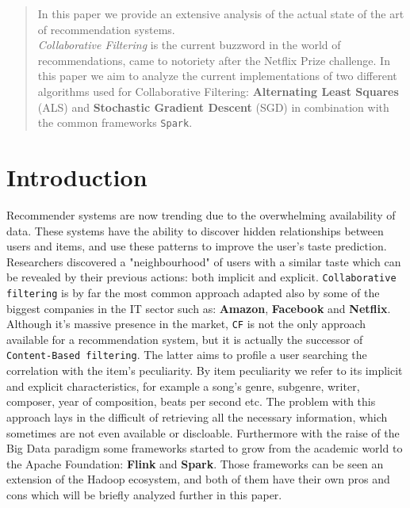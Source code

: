 \documentclass{sig-alternate-05-2015}
\begin{document}

\maketitle
\begin{abstract}

In this paper we provide an extensive analysis of the actual state of the
art of recommendation systems.\\
\textit{Collaborative Filtering} is the current buzzword in the
world of recommendations, came to notoriety after the Netflix Prize
challenge. In this paper we aim to analyze the current implementations
of two different algorithms used for Collaborative Filtering: \textbf{Alternating Least Squares} (ALS) and \textbf{Stochastic
Gradient Descent} (SGD) in combination with the common frameworks \texttt{Spark}.
\end{abstract}





\section{Introduction}
Recommender systems are now trending due to the overwhelming availability
of data. These systems have the ability to discover hidden relationships between
users and items, and use these patterns to improve the user's taste prediction.
Researchers discovered a "neighbourhood" of users with a similar taste
which can be revealed by their previous actions: both implicit and explicit.
\texttt{Collaborative filtering} is by far the most common approach adapted also by
some of the biggest companies in the IT sector such as: \textbf{Amazon}, \textbf{Facebook} and \textbf{Netflix}.
Although it's massive presence in the market, \texttt{CF} is not the only approach
available for a recommendation system, but it is actually the successor of
\texttt{Content-Based filtering}. The latter aims to profile a user searching
the correlation with the item's peculiarity. By item peculiarity we refer to
its implicit and explicit characteristics, for example a song's genre,
subgenre, writer, composer, year of composition, beats per second etc.
The problem with this approach lays in the difficult of retrieving all the necessary
information, which sometimes are not even available or discloable.
Furthermore with the raise of the Big Data paradigm some frameworks started to grow from
the academic world to the Apache Foundation: \textbf{Flink} and \textbf{Spark}.
Those frameworks can be seen an extension of the Hadoop ecosystem, and both of them
have their own pros and cons which will be briefly analyzed further in this paper.
\end{document}
